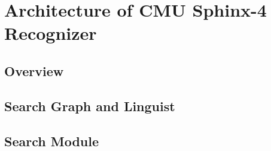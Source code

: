 \chapter{Architecture of CMU Sphinx-4 Recognizer}
\label{chap:sphinx}
 \section {Overview} 
  \section {Search Graph and Linguist} 
  \section {Search Module} 